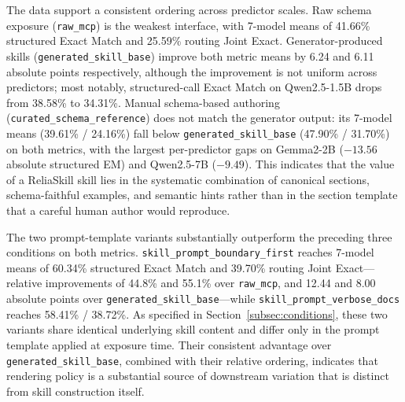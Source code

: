 \documentclass[11pt]{article}
\newcommand{\method}{ReliaSkill}
\begin{document}
\begin{table}[t]
\caption{
Archival rendering-policy results across seven predictor models and the five tabled representation conditions. Values are percentages; predictor columns are ordered by parameter count. \textbf{Bold} marks the best condition within each (predictor, metric) column. The two prompt-template variants share identical underlying skill content and differ only in rendering policy.
}
\label{tab:main_results}
\end{table}

The data support a consistent ordering across predictor scales. Raw schema exposure (\texttt{raw\_mcp}) is the weakest interface, with 7-model means of 41.66\% structured Exact Match and 25.59\% routing Joint Exact. Generator-produced skills (\texttt{generated\_skill\_base}) improve both metric means by 6.24 and 6.11 absolute points respectively, although the improvement is not uniform across predictors; most notably, structured-call Exact Match on Qwen2.5-1.5B drops from 38.58\% to 34.31\%. Manual schema-based authoring (\texttt{curated\_schema\_reference}) does not match the generator output: its 7-model means (39.61\% / 24.16\%) fall below \texttt{generated\_skill\_base} (47.90\% / 31.70\%) on both metrics, with the largest per-predictor gaps on Gemma2-2B ($-13.56$ absolute structured EM) and Qwen2.5-7B ($-9.49$). This indicates that the value of a \method{} skill lies in the systematic combination of canonical sections, schema-faithful examples, and semantic hints rather than in the section template that a careful human author would reproduce.

The two prompt-template variants substantially outperform the preceding three conditions on both metrics. \texttt{skill\_prompt\_boundary\_first} reaches 7-model means of 60.34\% structured Exact Match and 39.70\% routing Joint Exact---relative improvements of 44.8\% and 55.1\% over \texttt{raw\_mcp}, and 12.44 and 8.00 absolute points over \texttt{generated\_skill\_base}---while \texttt{skill\_prompt\_verbose\_docs} reaches 58.41\% / 38.72\%. As specified in Section~\ref{subsec:conditions}, these two variants share identical underlying skill content and differ only in the prompt template applied at exposure time. Their consistent advantage over \texttt{generated\_skill\_base}, combined with their relative ordering, indicates that rendering policy is a substantial source of downstream variation that is distinct from skill construction itself.
\end{document}
